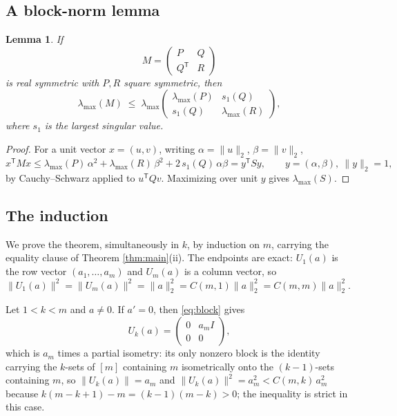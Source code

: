 \documentclass[11pt]{article}
\newtheorem{lemma}[theorem]{Lemma}
\theoremstyle{remark}
\begin{document}
\subsection{A block-norm lemma}
\begin{lemma}\label{lem:block}
If
\[
M=\begin{pmatrix} P & Q\\ Q^{\mathsf T} & R\end{pmatrix}
\]
is real symmetric with $P,R$ square symmetric, then
\[
\lambda_{\max}(M)\;\le\;
\lambda_{\max}\begin{pmatrix}\lambda_{\max}(P)&s_1(Q)\\ s_1(Q)&\lambda_{\max}(R)\end{pmatrix},
\]
where $s_1$ is the largest singular value.
\end{lemma}
\begin{proof}
For a unit vector $x=(u,v)$, writing $\alpha=\|u\|_2$, $\beta=\|v\|_2$,
\[
x^{\mathsf T}Mx \le \lambda_{\max}(P)\,\alpha^2+\lambda_{\max}(R)\,\beta^{2}
+2\,s_1(Q)\,\alpha\beta = y^{\mathsf T}Sy,
\qquad y=(\alpha,\beta),\ \|y\|_2=1,
\]
by Cauchy--Schwarz applied to $u^{\mathsf T}Qv$. Maximizing over unit $y$
gives $\lambda_{\max}(S)$.
\end{proof}

\subsection{The induction}
We prove the theorem, simultaneously in $k$, by induction on $m$, carrying
the equality clause of Theorem \ref{thm:main}(ii). The endpoints are
exact: $U_1(a)$ is the row vector $(a_1,\dots,a_m)$ and $U_m(a)$ is a
column vector, so
$\|U_1(a)\|^2=\|U_m(a)\|^2=\|a\|_2^2=C(m,1)\|a\|_2^2=C(m,m)\|a\|_2^2$.

Let $1<k<m$ and $a\ne0$. If $a'=0$, then \eqref{eq:block} gives
\[
U_k(a)=\begin{pmatrix} 0 & a_m I\\ 0 & 0\end{pmatrix},
\]
which is $a_m$ times a partial isometry: its only nonzero block is the
identity carrying the $k$-sets of $[m]$ containing $m$ isometrically onto
the $(k-1)$-sets containing $m$, so $\|U_k(a)\|=a_m$ and
$\|U_k(a)\|^2=a_m^2<C(m,k)\,a_m^2$ because
$k(m-k+1)-m=(k-1)(m-k)>0$; the inequality is strict in this case.
\end{document}
